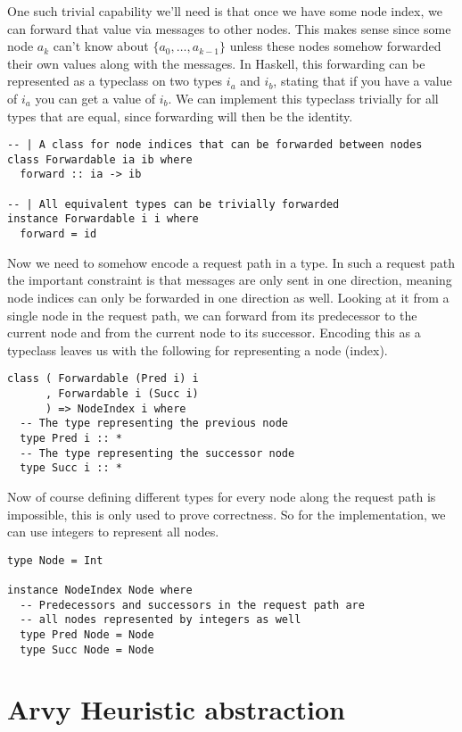 \documentclass[a4paper, oneside]{discothesis}
\begin{document}
One such trivial capability we'll need is that once we have some node index, we can forward that value via messages to other nodes. This makes sense since some node $a_{k}$ can't know about $\{a_{0},\dots,a_{k-1}\}$ unless these nodes somehow forwarded their own values along with the messages. In Haskell, this forwarding can be represented as a typeclass on two types $i_a$ and $i_b$, stating that if you have a value of $i_a$ you can get a value of $i_b$. We can implement this typeclass trivially for all types that are equal, since forwarding will then be the identity.

\begin{verbatim}
-- | A class for node indices that can be forwarded between nodes
class Forwardable ia ib where
  forward :: ia -> ib

-- | All equivalent types can be trivially forwarded
instance Forwardable i i where
  forward = id
\end{verbatim}

Now we need to somehow encode a request path in a type. In such a request path the important constraint is that messages are only sent in one direction, meaning node indices can only be forwarded in one direction as well. Looking at it from a single node in the request path, we can forward from its predecessor to the current node and from the current node to its successor. Encoding this as a typeclass leaves us with the following for representing a node (index).

\begin{verbatim}
class ( Forwardable (Pred i) i
      , Forwardable i (Succ i)
      ) => NodeIndex i where
  -- The type representing the previous node
  type Pred i :: *
  -- The type representing the successor node
  type Succ i :: *
\end{verbatim}

Now of course defining different types for every node along the request path is impossible, this is only used to prove correctness. So for the implementation, we can use integers to represent all nodes.

\begin{verbatim}
type Node = Int

instance NodeIndex Node where
  -- Predecessors and successors in the request path are
  -- all nodes represented by integers as well
  type Pred Node = Node
  type Succ Node = Node
\end{verbatim}

\section{Arvy Heuristic abstraction}
\end{document}
